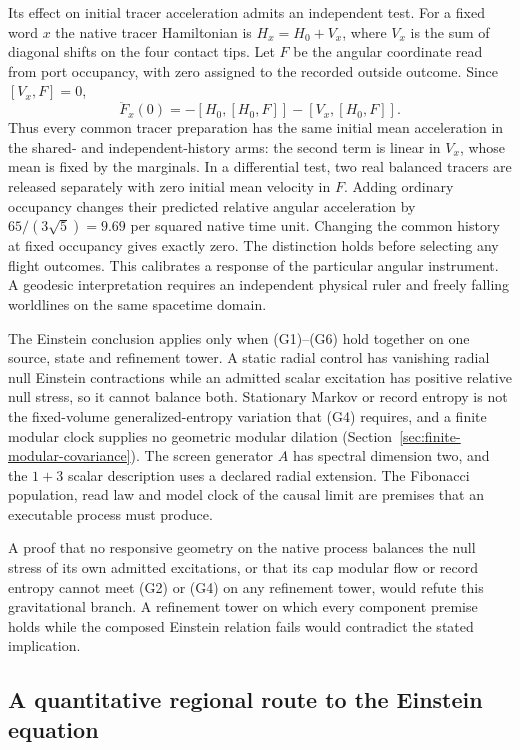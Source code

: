 \documentclass[11pt]{article}
\begin{document}
Its effect on initial tracer acceleration admits an independent test.
For a fixed word $x$ the native tracer Hamiltonian is $H_x=H_0+V_x$,
where $V_x$ is the sum of diagonal shifts on the four contact tips.
Let $F$ be the angular coordinate read from port occupancy, with zero
assigned to the recorded outside outcome. Since $[V_x,F]=0$,
\[
 \ddot F_x(0)=-[H_0,[H_0,F]]-[V_x,[H_0,F]] .
\]
Thus every common tracer preparation has the same initial mean acceleration
in the shared- and independent-history arms: the second term is linear
in $V_x$, whose mean is fixed by the marginals. In a differential test,
two real balanced tracers are released separately with zero initial
mean velocity in $F$. Adding ordinary occupancy changes their predicted
relative angular acceleration by $65/(3\sqrt5)=9.69$ per squared native
time unit. Changing the common history at fixed occupancy gives exactly
zero. The distinction holds before selecting any flight outcomes. This
calibrates a response of the particular angular instrument. A geodesic
interpretation requires an independent physical ruler and freely falling
worldlines on the same spacetime domain.

The Einstein conclusion applies only when (G1)--(G6) hold together on
one source, state and refinement tower. A static radial control has
vanishing radial null Einstein contractions while an admitted scalar
excitation has positive relative null stress, so it cannot balance both.
Stationary Markov or record entropy is not the fixed-volume
generalized-entropy variation that (G4) requires, and a finite modular
clock supplies no geometric modular dilation
(Section~\ref{sec:finite-modular-covariance}). The screen generator $A$
has spectral dimension two, and the $1+3$ scalar description uses a declared
radial extension. The Fibonacci population, read law and model clock of the
causal limit are premises that an executable process must produce.

A proof that no responsive geometry on the native process balances the null
stress of its own admitted excitations, or that its cap modular flow or record
entropy cannot meet (G2) or (G4) on any refinement tower, would refute this
gravitational branch. A refinement tower on which every component premise
holds while the composed Einstein relation fails would contradict the stated
implication.

\subsection*{A quantitative regional route to the Einstein equation}
\end{document}
